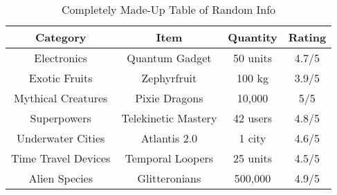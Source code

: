 \begin{table}[H]
    \centering
    \begin{tabular}{|c|c|c|c|}
    \hline
    \textbf{Category} & \textbf{Item} & \textbf{Quantity} & \textbf{Rating} \\
    \hline
    Electronics & Quantum Gadget & 50 units & 4.7/5 \\
    \hline
    Exotic Fruits & Zephyrfruit & 100 kg & 3.9/5 \\
    \hline
    Mythical Creatures & Pixie Dragons & 10,000 & 5/5 \\
    \hline
    Superpowers & Telekinetic Mastery & 42 users & 4.8/5 \\
    \hline
    Underwater Cities & Atlantis 2.0 & 1 city & 4.6/5 \\
    \hline
    Time Travel Devices & Temporal Loopers & 25 units & 4.5/5 \\
    \hline
    Alien Species & Glitteronians & 500,000 & 4.9/5 \\
    \hline
    \end{tabular}
    \caption{Completely Made-Up Table of Random Info}
    \label{tab:randominfo}
\end{table}